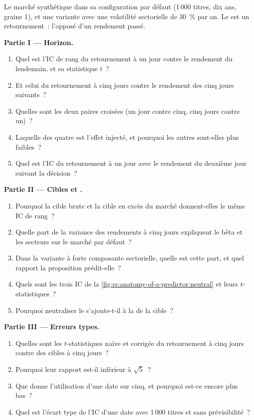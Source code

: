 \begin{problem}\label{pb:rs:anatomy-of-a-predictor:1}
Le marché synthétique dans sa configuration par défaut (1\,000 titres, dix ans, graine 1), et une variante avec une volatilité sectorielle de
30~\% par an. Le  est un retournement~: l'opposé d'un rendement passé.

\medskip\noindent\textbf{Partie I --- Horizon.}
\begin{enumerate}
\item Quel est l'IC de rang du retournement à un jour contre le rendement du lendemain, et sa statistique $t$~?
\item Et celui du retournement à cinq jours contre le rendement des cinq jours suivants~?
\item Quelles sont les deux paires croisées (un jour contre cinq, cinq jours contre un)~?
\item Laquelle des quatre est l'effet injecté, et pourquoi les autres sont-elles plus faibles~?
\item Quel est l'IC du retournement à un jour avec le rendement du deuxième jour suivant la décision~?
\end{enumerate}

\medskip\noindent\textbf{Partie II --- Cibles et .}
\begin{enumerate}[resume]
\item Pourquoi la cible brute et la cible en excès du marché donnent-elles le même IC de rang~?
\item Quelle part de la variance des rendements à cinq jours expliquent le bêta et les secteurs sur le marché par défaut~?
\item Dans la variante à forte composante sectorielle, quelle est cette part, et quel rapport la proposition prédit-elle~?
\item Quels sont les trois IC de la \cref{fig:rs:anatomy-of-a-predictor:neutral} et leurs $t$-statistiques~?
\item Pourquoi neutraliser le  s'ajoute-t-il à la  de la cible~?
\end{enumerate}

\medskip\noindent\textbf{Partie III --- Erreurs types.}
\begin{enumerate}[resume]
\item Quelles sont les $t$-statistiques naïve et corrigée du retournement à cinq jours contre des cibles à cinq jours~?
\item Pourquoi leur rapport est-il inférieur à $\sqrt5$~?
\item Que donne l'utilisation d'une date sur cinq, et pourquoi est-ce encore plus bas~?
\item Quel est l'écart type de l'IC d'une date avec 1\,000 titres et sans prévisibilité~?
\end{enumerate}


\end{problem}
